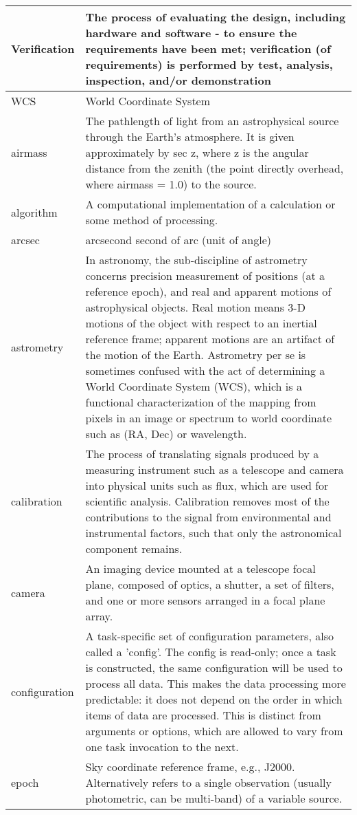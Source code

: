\begin{longtable}{|l|p{}|}
Verification & The process of evaluating the design, including hardware and software - to ensure the requirements have been met;  verification (of requirements) is performed by test, analysis, inspection, and/or demonstration \\\hline
WCS & World Coordinate System \\\hline
airmass & The pathlength of light from an astrophysical source through the Earth's atmosphere. It is given approximately by sec z, where z is the angular distance from the zenith (the point directly overhead, where airmass = 1.0) to the source. \\\hline
algorithm & A computational implementation of a calculation or some method of processing. \\\hline
arcsec & arcsecond second of arc (unit of angle) \\\hline
astrometry & In astronomy, the sub-discipline of astrometry concerns precision measurement of positions (at a reference epoch), and real and apparent motions of astrophysical objects. Real motion means 3-D motions of the object with respect to an inertial reference frame; apparent motions are an artifact of the motion of the Earth. Astrometry per se is sometimes confused with the act of determining a World Coordinate System (WCS), which is a functional characterization of the mapping from pixels in an image or spectrum to world coordinate such as (RA, Dec) or wavelength. \\\hline
calibration & The process of translating signals produced by a measuring instrument such as a telescope and camera into physical units such as flux, which are used for scientific analysis. Calibration removes most of the contributions to the signal from environmental and instrumental factors, such that only the astronomical component remains. \\\hline
camera & An imaging device mounted at a telescope focal plane, composed of optics, a shutter, a set of filters, and one or more sensors arranged in a focal plane array. \\\hline
configuration & A task-specific set of configuration parameters, also called a 'config'. The config is read-only; once a task is constructed, the same configuration will be used to process all data. This makes the data processing more predictable: it does not depend on the order in which items of data are processed. This is distinct from arguments or options, which are allowed to vary from one task invocation to the next. \\\hline
epoch & Sky coordinate reference frame, e.g., J2000. Alternatively refers to a single observation (usually photometric, can be multi-band) of a variable source. \\\hline

\end{longtable}
